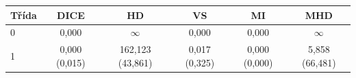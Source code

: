 \begin{tabular}{l c c c c c}
 \hline
Třída & DICE & HD & VS & MI & MHD \\ \hline
0 & 0,000 & $\infty$ & 0,000 & 0,000 & $\infty$ \\
1 & 0,000 (0,015) & 162,123 (43,861) & 0,017 (0,325) & 0,000 (0,000) & 5,858 (66,481) \\
\hline 
 \end{tabular}
